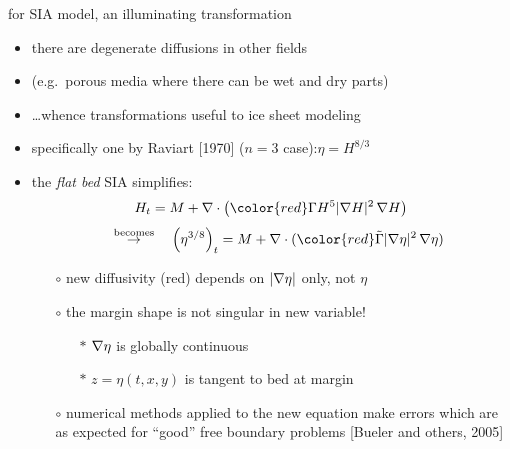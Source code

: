 \begin{frame}{for SIA model, an illuminating transformation}

\begin{itemize}
\item there are degenerate diffusions in other fields
\item (e.g.~porous media where there can be wet and dry parts)
\item \dots whence transformations useful to ice sheet modeling
\item specifically one by Raviart [1970]\nocite{Raviart} \scriptsize($n=3$ case)\normalsize:\qquad $\eta = H^{8/3}$
\item the \emph{flat bed} SIA simplifies:
	$$H_t = M + \Div \left({\color{red}\Gamma H^5 |\grad H|^2}\, \grad H \right)$$
	$$\quad \stackrel{\text{becomes}}{\to} \quad  \left(\eta^{3/8}\right)_t = M + \Div ({\color{red}\tilde\Gamma |\grad \eta|^2}\, \grad \eta)$$
  \begin{itemize}
  \item[$\circ$] new diffusivity ({\color{red}red}) depends on $|\nabla \eta|$ only, not $\eta$
  \item[$\circ$] the margin shape is not singular in new variable!
     \begin{itemize}
     \item[$\ast$]  $\nabla \eta$ is globally continuous
     \item[$\ast$] $z=\eta(t,x,y)$ is tangent to bed at margin
     \end{itemize}
  \item[$\circ$] numerical methods applied to the new equation make errors which are as expected for ``good'' free boundary problems [Bueler and others, 2005]\nocite{BLKCB}
  \end{itemize}
\end{itemize}
\end{frame}




